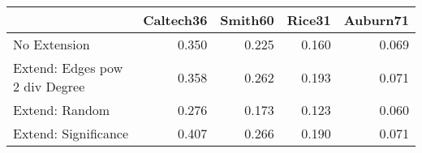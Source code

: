 \begin{tabular}{lrrrr}
\toprule
{} & Caltech36 & Smith60 & Rice31 & Auburn71 \\
\midrule
No Extension                   &     0.350 &   0.225 &  0.160 &    0.069 \\
Extend: Edges pow 2 div Degree &     0.358 &   0.262 &  0.193 &    0.071 \\
Extend: Random                 &     0.276 &   0.173 &  0.123 &    0.060 \\
Extend: Significance           &     0.407 &   0.266 &  0.190 &    0.071 \\
\bottomrule
\end{tabular}
